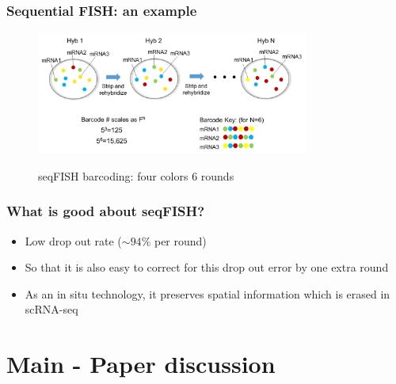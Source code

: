 \documentclass{beamer}
\begin{document}
  \begin{frame}
  \frametitle{Sequential FISH: an example}
  \begin{figure}
    \centering
    \includegraphics[width=0.8\textwidth]{seqFISH-Barcoding}
    \caption{seqFISH barcoding: four colors 6 rounds} \cite{seqfish}
  \end{figure}
  \end{frame}

  \begin{frame}
  \frametitle{What is good about seqFISH?}
  \begin{itemize}
    \item Low drop out rate ($\sim 94\%$ per round) \cite{shah2016situ}
    \item So that it is also easy to correct for this drop out error by one extra round
    \item As an in situ technology, it preserves spatial information which is erased in scRNA-seq
  \end{itemize}
  \end{frame}

\section{Main - Paper discussion}
\end{document}
